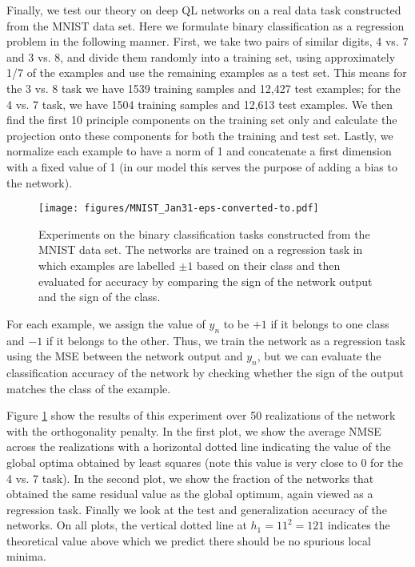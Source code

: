 \documentclass[11pt]{article}
\theoremstyle{plain}
\theoremstyle{plain}
\numberwithin{equation}{section}
\numberwithin{lemma}{section}
\numberwithin{theorem}{section}
\numberwithin{corollary}{section}
\numberwithin{observation}{section}
\numberwithin{definition}{section}
\numberwithin{example}{section}
\begin{document}
Finally, we test our theory on deep QL networks on a real data task constructed from the MNIST data set.  Here we formulate binary classification as a regression problem in the following manner.  First, we take two pairs of similar digits, 4 vs. 7 and 3 vs. 8, and divide them randomly into a training set, using approximately 1/7 of the examples and use the remaining examples as a test set.  This means for the 3 vs. 8 task we have 1539 training samples and 12,427 test examples; for the 4 vs. 7 task, we have 1504 training samples and 12,613 test examples.  We then find the first 10 principle components on the training set only and calculate the projection onto these components for both the training and test set.  Lastly, we normalize each example to have a norm of 1 and concatenate a first dimension with a fixed value of 1 (in our model this serves the purpose of adding a bias to the network).

\begin{figure}
\begin{center}
\noindent
\texttt{[image: figures/MNIST\_Jan31-eps-converted-to.pdf]}
\caption{Experiments on the binary classification tasks constructed from the MNIST data set.  The networks are trained on a regression task in which examples are labelled $\pm 1$ based on their class and then evaluated for accuracy by comparing the sign of the network output and the sign of the class.}
\label{fig:MNIST_Exp}
\end{center}
\end{figure}

For each example, we assign the value of $y_n$ to be $+1$ if it belongs to one class and $-1$ if it belongs to the other.  Thus, we train the network as a regression task using the MSE between the network output and $y_n$, but we can evaluate the classification accuracy of the network by checking whether the sign of the output matches the class of the example.



Figure \ref{fig:MNIST_Exp} show the results of this experiment over 50 realizations of the network with the orthogonality penalty.  In the first plot, we show the average NMSE across the realizations with a horizontal dotted line indicating the value of the global optima obtained by least squares (note this value is very close to 0 for the 4 vs. 7 task).  In the second plot, we show the fraction of the networks that obtained the same residual value as the global optimum, again viewed as a regression task.  Finally we look at the test and generalization accuracy of the networks.  On all plots, the vertical dotted line at $h_1 = 11^2 = 121$ indicates the theoretical value above which we predict there should be no spurious local minima.
\end{document}

